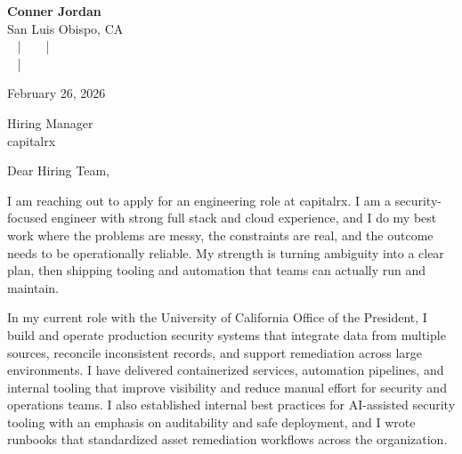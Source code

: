 \documentclass[letterpaper,11pt]{article}
\newcommand{\companyname}{capitalrx}
\begin{document}
\begin{center}
  {\Huge \textbf{Conner Jordan}}\\[4pt]
  {\Large San Luis Obispo, CA}\\[4pt]
  \href{tel:+18059759793}{
    } ~ | ~
  \href{mailto:connercharlesjordan@gmail.com}{
    } ~ | ~
   \\
  \href{https://www.linkedin.com/in/conner-jordan-4b268514a/}{
    } ~ | ~
  \href{https://github.com/cjordan223}{
    }
\end{center}

\vspace{16pt}

\begin{flushright}
February 26, 2026
\end{flushright}

Hiring Manager\\
\companyname

\vspace{26pt}

\noindent
Dear Hiring Team,

\vspace{16pt}

I am reaching out to apply for an engineering role at \companyname. I am a security-focused engineer with strong full stack and cloud experience, and I do my best work where the problems are messy, the constraints are real, and the outcome needs to be operationally reliable. My strength is turning ambiguity into a clear plan, then shipping tooling and automation that teams can actually run and maintain.

\vspace{16pt}

In my current role with the University of California Office of the President, I build and operate production security systems that integrate data from multiple sources, reconcile inconsistent records, and support remediation across large environments. I have delivered containerized services, automation pipelines, and internal tooling that improve visibility and reduce manual effort for security and operations teams. I also established internal best practices for AI-assisted security tooling with an emphasis on auditability and safe deployment, and I wrote runbooks that standardized asset remediation workflows across the organization.
\end{document}
